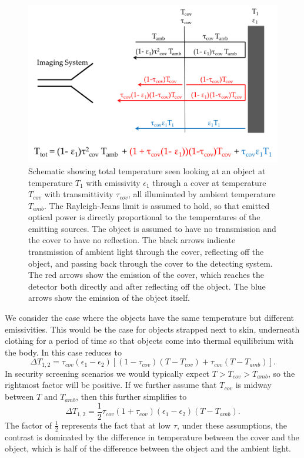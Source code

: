 \begin{figure}
\centering
\includegraphics[width=6in]{images/ch1-t-tot.png}
\caption[Apparent temperature of a covered illuminated object]{
  Schematic showing total temperature seen looking at an object at temperature $T_1$ with emissivity $\epsilon_1$ through a cover at temperature $T_{cov}$ with transmittivity $\tau_{cov}$, all illuminated by ambient temperature $T_{amb}$.
  The Rayleigh-Jeans limit is assumed to hold, so that emitted optical power is directly proportional to the temperatures of the emitting sources.
  The object is assumed to have no transmission and the cover to have no reflection.
  The black arrows indicate transmission of ambient light through the cover, reflecting off the object, and passing back through the cover to the detecting system.
  The red arrows show the emission of the cover, which reaches the detector both directly and after reflecting off the object.
  The blue arrows show the emission of the object itself.
}
\label{fig:ch1-t-tot}
\end{figure}

We consider the case where the objects have the same temperature but different emissivities.
This would be the case for objects strapped next to skin, underneath clothing for a period of time so that objects come into thermal equilibrium with the body.
In this case  reduces to
\begin{equation}
  \Delta T_{1,2} = \tau_{cov} (\epsilon_1 - \epsilon_2) \left[ (1 - \tau_{cov}) (T - T_{cov}) + \tau_{cov} (T - T_{amb}) \right].
\end{equation}
In security screening scenarios we would typically expect $T > T_{cov} > T_{amb}$, so the rightmost factor will be positive.
If we further assume that $T_{cov}$ is midway between $T$ and $T_{amb}$, then this further simplifies to
\begin{equation} \label{eqn:ch1-delta-t-simple}
  \Delta T_{1,2} = \frac{1}{2}\tau_{cov}(1+\tau_{cov}) (\epsilon_1 - \epsilon_2) (T - T_{amb}).
\end{equation}
The factor of $\frac{1}{2}$ represents the fact that at low $\tau$, under these assumptions, the contrast is dominated by the difference in temperature between the cover and the object, which is half of the difference between the object and the ambient light.

